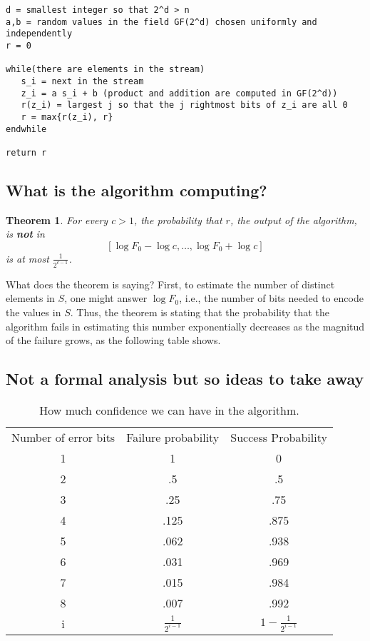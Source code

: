 \documentclass[12pt]{article}
\newtheorem{theorem}{Theorem}
\begin{document}
\begin{verbatim}
d = smallest integer so that 2^d > n
a,b = random values in the field GF(2^d) chosen uniformly and independently
r = 0

while(there are elements in the stream)
   s_i = next in the stream
   z_i = a s_i + b (product and addition are computed in GF(2^d))
   r(z_i) = largest j so that the j rightmost bits of z_i are all 0
   r = max{r(z_i), r}       
endwhile

return r

\end{verbatim}



\subsection{What is the algorithm computing?}

\begin{theorem}
For every $c > 1$, the probability that $r$, the output of the algorithm, is {\bf not} in 
$$[\log F_0 - \log c, \hdots, \log F_0 + \log c]$$ 
is at most $\frac{1}{2^{c-1}}$.
\end{theorem}

What does the theorem is saying?
First, to estimate the number of distinct elements in $S$, one might answer $\log F_0$,
i.e., the number of bits needed to encode the values in $S$. 
Thus, the theorem is stating that the probability that the algorithm fails in estimating
this number exponentially decreases as the magnitud of the failure grows,
as the following table shows.


\subsection{Not a formal analysis but so ideas to take away}
\begin{table}[htdp]

\begin{center}
\begin{tabular}{|c|c|c|}
Number of error bits & Failure probability & Success Probability \\
1 & 1 & 0 \\
2 & .5 & .5 \\
3 & .25 & .75 \\
4 & .125 & .875 \\
5 & .062 & .938 \\
6 & .031 & .969 \\
7 & .015 & .984 \\
8 & .007 & .992 \\
i & $\frac{1} {2^{i-1}}$ & $1- \frac {1} {2^{i-1}}$

\end{tabular}
\end{center}
\label{table}
\caption{How much confidence we can have in the algorithm.}
\end{table}%
\end{document}
